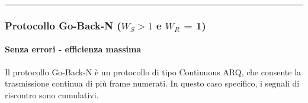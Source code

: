 \vspace{1em}
\noindent\rule{\linewidth}{0.4pt}
\vspace{1em}



\subsubsection{Protocollo Go-Back-N ($W_S > 1$ e $W_R$ = 1)}
\paragraph{Senza errori - efficienza massima}
Il protocollo Go-Back-N è un protocollo di tipo Continuous ARQ, che consente la trasmissione continua di più frame numerati. In questo caso specifico, i segnali di riscontro sono cumulativi.

